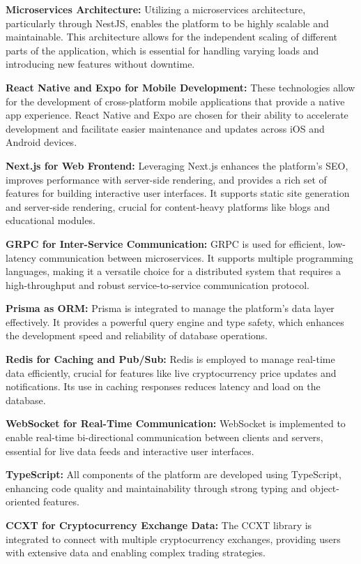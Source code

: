\documentclass[12pt]{report}
\begin{document}
\textbf{Microservices Architecture:} Utilizing a microservices architecture, particularly through NestJS, enables the platform to be highly scalable and maintainable. This architecture allows for the independent scaling of different parts of the application, which is essential for handling varying loads and introducing new features without downtime.

\textbf{React Native and Expo for Mobile Development:} These technologies allow for the development of cross-platform mobile applications that provide a native app experience. React Native and Expo are chosen for their ability to accelerate development and facilitate easier maintenance and updates across iOS and Android devices.

\textbf{Next.js for Web Frontend:} Leveraging Next.js enhances the platform's SEO, improves performance with server-side rendering, and provides a rich set of features for building interactive user interfaces. It supports static site generation and server-side rendering, crucial for content-heavy platforms like blogs and educational modules.

\textbf{GRPC for Inter-Service Communication:} GRPC is used for efficient, low-latency communication between microservices. It supports multiple programming languages, making it a versatile choice for a distributed system that requires a high-throughput and robust service-to-service communication protocol.

\textbf{Prisma as ORM:} Prisma is integrated to manage the platform’s data layer effectively. It provides a powerful query engine and type safety, which enhances the development speed and reliability of database operations.

\textbf{Redis for Caching and Pub/Sub:} Redis is employed to manage real-time data efficiently, crucial for features like live cryptocurrency price updates and notifications. Its use in caching responses reduces latency and load on the database.

\textbf{WebSocket for Real-Time Communication:} WebSocket is implemented to enable real-time bi-directional communication between clients and servers, essential for live data feeds and interactive user interfaces.

\textbf{TypeScript:} All components of the platform are developed using TypeScript, enhancing code quality and maintainability through strong typing and object-oriented features.

\textbf{CCXT for Cryptocurrency Exchange Data:} The CCXT library is integrated to connect with multiple cryptocurrency exchanges, providing users with extensive data and enabling complex trading strategies.
\end{document}
